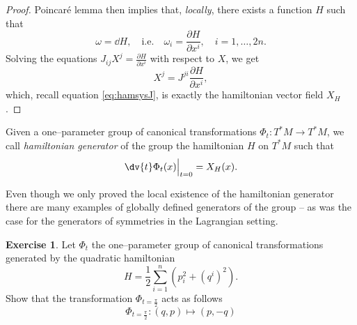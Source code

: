 \documentclass[english,fontsize=11pt,paper=b5]{scrbook}
\numberwithin{equation}{chapter}
\theoremstyle{definition}
\newtheorem{exercise}{Exercise}[chapter]
\begin{document}
\begin{proof}
      Poincar\'e lemma \cite{book:lee} then implies that, \emph{locally}, there exists a function $H$ such that
      \begin{equation}
        \omega = \dd H, \quad\mbox{i.e.}\quad \omega_i = \frac{\partial H}{\partial x^i}, \quad i=1,\ldots,2n.
      \end{equation}
      Solving the equations $J_{ij} X^j = \frac{\partial H}{\partial x^i}$ with respect to $X$, we get
      \begin{equation}\label{eq:hamsysJ-1}
        X^j = J^{ji} \frac{\partial H}{\partial x^i},
      \end{equation}
      which, recall equation \eqref{eq:hamsysJ}, is exactly the hamiltonian vector field $X_H$.
    \end{proof}

    \begin{tcolorbox}
      Given a one--parameter group of canonical transformations $\Phi_t:T^*M\to T^*M$, we call \emph{hamiltonian generator} of the group the hamiltonian $H$ on $T^*M$ such that
      \begin{equation}
        \dv{t}\Phi_t(x)\Big|_{t=0} = X_H(x).
      \end{equation}
    \end{tcolorbox}

    Even though we only proved the local existence of the hamiltonian generator there are many examples of globally defined generators of the group -- as was the case for the generators of symmetries in the Lagrangian setting.

    \begin{exercise}
      Let $\Phi_t$ the one--parameter group of canonical transformations generated by the quadratic hamiltonian
      \begin{equation}
        H = \frac12 \sum_{i=1}^n\left(p_i^2 + (q^i)^2\right).
      \end{equation}
      Show that the transformation $\Phi_{t=\frac\pi2}$ acts as follows
      \begin{equation}
        \Phi_{t=\frac\pi2} : (q,p) \mapsto (p, -q)
      \end{equation}
    \end{exercise}
\end{document}
